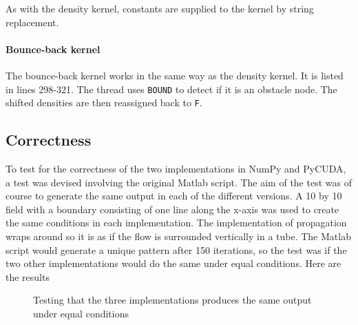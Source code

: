 As with the density kernel, constants are supplied to the kernel by string replacement.


\paragraph{Bounce-back kernel}
The bounce-back kernel works in the same way as the density kernel. It is listed in  lines 298-321. The thread uses \texttt{BOUND} to detect if it is an obstacle node. The shifted densities are then reassigned back to \texttt{F}.




\subsection{Correctness}
To test for the correctness of the two implementations in NumPy and PyCUDA, a test was devised involving the original Matlab script. The aim of the test was of course to generate the same output in each of the different versions. A 10 by 10 field with a boundary consisting of one line along the x-axis was used to create the same conditions in each implementation. The implementation of propagation wraps around so it is as if the flow is surrounded vertically in a tube. The Matlab script would generate a unique pattern after 150 iterations, so the test was if the two other implementations would do the same under equal conditions. Here are the results

\begin{figure}[H]
\centering
{}
\hspace{1pt}
\caption{Testing that the three implementations produces the same output under equal conditions}
\label{correctness}
\end{figure}

